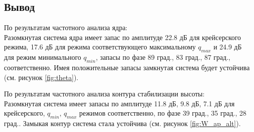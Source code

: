 \subsection{Вывод}
По результатам частотного анализа ядра:\\
Разомкнутая система ядра имеет запас по амплитуде 22.8 дБ для крейсерского
режима, 17.6 дБ для режима соответствующего максимальному $q_{max}$ и 24.9 дБ для
режим минимального $q_{min}$, запасы по фазе 89 град., 83 град., 87 
град., соответственно. Имея положительные запасы замкнутая система будет
устойчива (см. рисунок \ref{fig:theta}).

По результатам частотного анализа контура стабилизации высоты:\\
Разомкнутая система имеет запасы по амплитуде 11.8 дБ, 9.8 дБ, 7.1 дБ для
крейсерского, $q_{min}$, $q_{max}$ режимов соответственно, по фазе 39 град., 35 
град., 28 град.. Замыкая контур система стала устойчива
(см. рисунок \ref{fig:W_ap_alt}).

